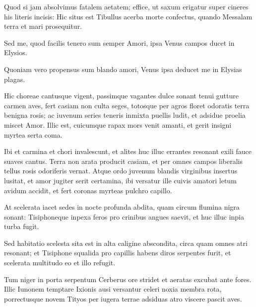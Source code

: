 \noindent Quod si jam absolvimus fatalem aetatem; effice, ut saxum erigatur super cineres his literis incisis: Hic situs est Tibullus acerba morte confectus, quando Messalam terra et mari prosequitur. \\

{\large

\noindent Sed me, quod facilis tenero sum semper Amori, ipsa Venus campos ducet in Elysios.\\

}


\noindent Quoniam vero propensus sum blando amori, Venus ipsa deducet me in Elysias plagas. \\

{\large

\noindent Hic choreae cantusque vigent, passimque vagantes dulce sonant tenui gutture carmen aves, fert casiam non culta seges, totosque per agros floret odoratis terra benigna rosis; ac iuvenum series teneris inmixta puellis ludit, et adsidue proelia miscet Amor. Illic est, cuicumque rapax mors venit amanti, et gerit insigni myrtea serta coma.\\

}


\noindent Ibi et carmina et chori invalescunt, et alites huc illuc errantes resonant exili fauce suaves cantus. Terra non arata producit casiam, et per omnes campos liberalis tellus rosis odoriferis vernat. Atque ordo juvenum blandis virginibus insertus lusitat, et amor jugiter serit certamina, ibi versatur ille cuivis amatori letum avidum accidit, et fert coronas myrteas pulchro capillo. \\


{\large

\noindent At scelerata iacet sedes in nocte profunda abdita, quam circum flumina nigra sonant: Tisiphoneque inpexa feros pro crinibus angues saevit, et huc illuc inpia turba fugit.\\

}


\noindent Sed habitatio scelesta sita est in alta caligine abscondita, circa quam omnes atri resonant; et Tisiphone squalida pro capillis habens diros serpentes furit, et scelerata multitudo eo et illo refugit.\\


{\large

\noindent Tum niger in porta serpentum Cerberus ore stridet et aeratas excubat ante fores. Illic Iunonem temptare Ixionis ausi versantur celeri noxia membra rota, porrectusque novem Tityos per iugera terrae adsiduas atro viscere pascit aves.\\

}


